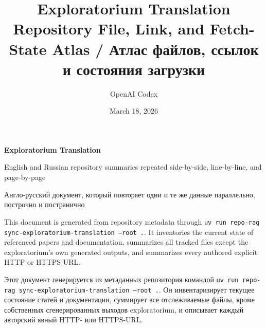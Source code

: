 \documentclass[11pt]{article}
\title{Exploratorium Translation\\\large Repository File, Link, and Fetch-State Atlas / Атлас файлов, ссылок и состояния загрузки}
\author{OpenAI Codex}
\date{March 18, 2026}
\begin{document}
\maketitle
\thispagestyle{empty}

\noindent\colorbox{ExploratoriumNavy}{%
  \parbox{\dimexpr\linewidth-2\fboxsep\relax}{%
    \vspace{10pt}
    {\color{white}\Large\bfseries Exploratorium Translation}\par
    \vspace{4pt}
    {\color{ExploratoriumMist}\normalsize English and Russian repository summaries repeated side-by-side, line-by-line, and page-by-page}\par
    \vspace{4pt}
    {\color{ExploratoriumGold}\normalsize Англо-русский документ, который повторяет одни и те же данные параллельно, построчно и постранично}\par
    \vspace{10pt}
  }%
}

\vspace{1em}

\noindent This document is generated from repository metadata through
\texttt{uv run repo-rag sync-exploratorium-translation --root .}. It inventories the current
state of referenced papers and documentation, summarizes all tracked files except the
exploratorium's own generated outputs, and summarizes every authored explicit HTTP or HTTPS URL.

\par\smallskip\noindent Этот документ генерируется из метаданных репозитория командой
\texttt{uv run repo-rag sync-exploratorium-translation --root .}. Он инвентаризирует текущее
состояние статей и документации, суммирует все отслеживаемые файлы, кроме собственных
сгенерированных выходов exploratorium, и описывает каждый авторский явный HTTP- или HTTPS-URL.

\tableofcontents
\newpage


\end{document}
